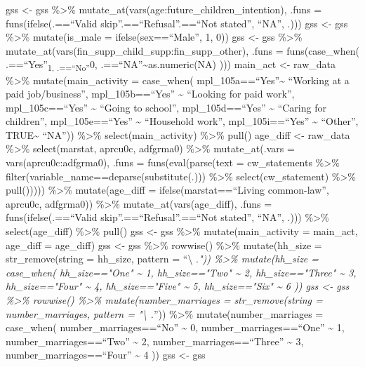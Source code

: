 \documentclass[
]{article}
\begin{document}
gss \textless- gss \%\textgreater\%
mutate\_at(vars(age:future\_children\_intention), .funs =
funs(ifelse(.==``Valid skip''\textbar.==``Refusal''\textbar.==``Not
stated'', ``NA'', .))) gss \textless- gss \%\textgreater\%
mutate(is\_male = ifelse(sex==``Male'', 1, 0)) gss \textless- gss
\%\textgreater\%
mutate\_at(vars(fin\_supp\_child\_supp:fin\_supp\_other), .funs =
funs(case\_when( .==``Yes''\textsubscript{1, .==``No''}0,
.==``NA''\textasciitilde as.numeric(NA) ))) main\_act \textless-
raw\_data \%\textgreater\% mutate(main\_activity = case\_when(
mpl\_105a==``Yes''\textasciitilde{} ``Working at a paid job/business'',
mpl\_105b==``Yes'' \textasciitilde{} ``Looking for paid work'',
mpl\_105c==``Yes'' \textasciitilde{} ``Going to school'',
mpl\_105d==``Yes'' \textasciitilde{} ``Caring for children'',
mpl\_105e==``Yes'' \textasciitilde{} ``Household work'',
mpl\_105i==``Yes'' \textasciitilde{} ``Other'', TRUE\textasciitilde{}
``NA'')) \%\textgreater\% select(main\_activity) \%\textgreater\% pull()
age\_diff \textless- raw\_data \%\textgreater\% select(marstat, aprcu0c,
adfgrma0) \%\textgreater\% mutate\_at(.vars = vars(aprcu0c:adfgrma0),
.funs = funs(eval(parse(text = cw\_statements \%\textgreater\%
filter(variable\_name==deparse(substitute(.))) \%\textgreater\%
select(cw\_statement) \%\textgreater\% pull())))) \%\textgreater\%
mutate(age\_diff = ifelse(marstat==``Living common-law'', aprcu0c,
adfgrma0)) \%\textgreater\% mutate\_at(vars(age\_diff), .funs =
funs(ifelse(.==``Valid skip''\textbar.==``Refusal''\textbar.==``Not
stated'', ``NA'', .))) \%\textgreater\% select(age\_diff)
\%\textgreater\% pull() gss \textless- gss \%\textgreater\%
mutate(main\_activity = main\_act, age\_diff = age\_diff) gss \textless-
gss \%\textgreater\% rowwise() \%\textgreater\% mutate(hh\_size =
str\_remove(string = hh\_size, pattern = ``\textbackslash{} .\emph{"))
\%\textgreater\% mutate(hh\_size = case\_when( hh\_size=="One"
\textasciitilde{} 1, hh\_size=="Two" \textasciitilde{} 2,
hh\_size=="Three" \textasciitilde{} 3, hh\_size=="Four"
\textasciitilde{} 4, hh\_size=="Five" \textasciitilde{} 5,
hh\_size=="Six" \textasciitilde{} 6 )) gss \textless- gss
\%\textgreater\% rowwise() \%\textgreater\% mutate(number\_marriages =
str\_remove(string = number\_marriages, pattern = "\textbackslash{}
.}'')) \%\textgreater\% mutate(number\_marriages = case\_when(
number\_marriages==``No'' \textasciitilde{} 0,
number\_marriages==``One'' \textasciitilde{} 1,
number\_marriages==``Two'' \textasciitilde{} 2,
number\_marriages==``Three'' \textasciitilde{} 3,
number\_marriages==``Four'' \textasciitilde{} 4 )) gss \textless- gss
\end{document}
